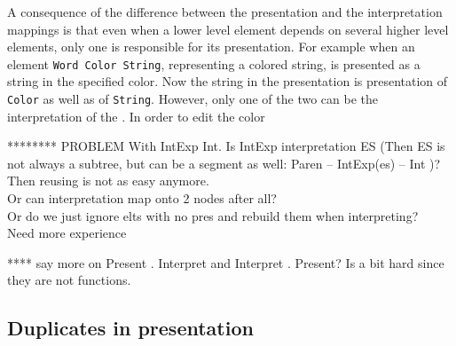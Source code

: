 A consequence of the difference between the presentation and the interpretation mappings is that even when a lower level element depends on several higher level elements, only one is responsible for its presentation. For example when an element \verb|Word Color String|, representing a colored string, is presented as a string in the specified color. Now the string in the presentation is presentation of \verb|Color| as well as of \verb|String|. However, only one of the two can be the interpretation of the . In order to edit the color


   

******** PROBLEM With IntExp  Int. 
Is IntExp interpretation ES (Then ES is not always a subtree, but can be a segment as well: Paren -- IntExp(es) -- Int )? Then reusing is not as easy anymore.\\
Or can interpretation map onto 2 nodes after all?\\
Or do we just ignore elts with no pres and rebuild them when interpreting?\\
Need more experience



**** say more on Present . Interpret and Interpret . Present? Is a bit hard since they are not functions.

\fromHere  %

%
%





%																
\subsection{Duplicates in presentation}

